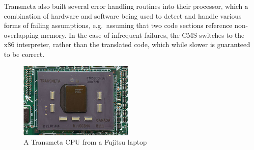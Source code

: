 Transmeta also built several error handling routines into their processor, which
a combination of hardware and software being used to detect and handle various
forms of failing assumptions, e.g.\ assuming that two code sections reference
non-overlapping memory. In the case of infrequent failures, the CMS switches to
the x86 interpreter, rather than the translated code, which while slower is
guaranteed to be correct.\cite{TransmetaCodeMorph}

\begin{figure}
  \includegraphics[width=0.5\textwidth]{imgs/Transmeta_TM5600}
  \caption{A Transmeta CPU from a Fujitsu laptop}
\end{figure}

